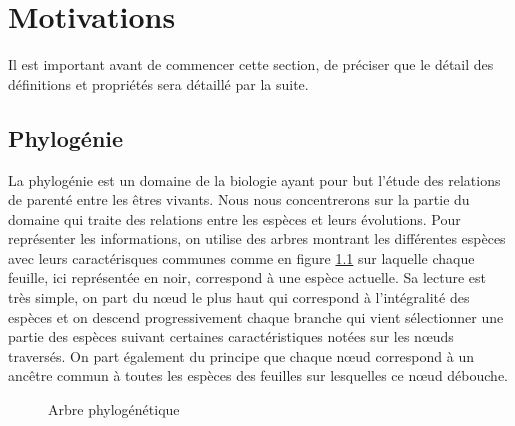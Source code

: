 \chapter{Motivations}

Il est important avant de commencer cette section, de préciser que le détail des définitions et propriétés sera détaillé par la suite.

\section{Phylogénie}

La phylogénie est un domaine de la biologie ayant pour but l'étude des relations de parenté entre les êtres vivants. Nous nous concentrerons sur la partie du domaine qui traite des relations entre les espèces et leurs évolutions. Pour représenter les informations, on utilise des arbres montrant les différentes espèces avec leurs caractérisques communes comme en figure \ref{arbre_phylogenie} sur laquelle chaque feuille, ici représentée en noir, correspond à une espèce actuelle. Sa lecture est très simple, on part du n\oe ud le plus haut qui correspond à l'intégralité des espèces et on descend progressivement chaque branche qui vient sélectionner une partie des espèces suivant certaines caractéristiques notées sur les n\oe uds traversés. On part également du principe que chaque n\oe ud correspond à un ancêtre commun à toutes les espèces des feuilles sur lesquelles ce n\oe ud débouche.

\begin{figure}[H]
	\begin{center}
	\end{center}
	\caption{Arbre phylogénétique}
	\label{arbre_phylogenie}
\end{figure}

